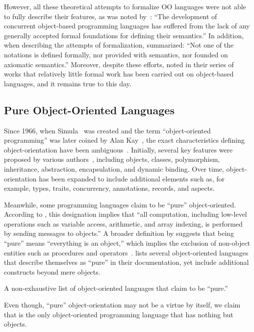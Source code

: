 However, all these theoretical attempts to formalize OO languages were not able to fully describe their features, as was noted by~\citet{nierstrasz1991towards}: ``The development of concurrent object-based programming languages has suffered from the lack of any generally accepted formal foundations for defining their semantics.''
In addition, when describing the attempts of formalization, \citet{eden2002visual} summarized: ``Not one of the notations is defined formally, nor provided with  semantics, nor founded on axiomatic semantics.''
Moreover, despite these efforts, \citet{ciaffaglione2003reasoning,ciaffaglione2003typetheories,ciaffaglione2007theory_of_contexts} noted in their series of works that relatively little formal work has been carried out on object-based languages, and it remains true to this day.

\subsection{Pure Object-Oriented Languages}

Since 1966, when Simula~\citep{dahl1966simula} was created and the term ``object-oriented programming'' was later coined by
Alan Kay~\citep{kay97keynote}, the exact characteristics defining object-orientation have been ambiguous~\citep{stefik1985object,madsen1988object,armstrong2006quarks}.
Initially, several key features were proposed by various authors~\citep{nygaard1986basic,stroustrup1987object,meyer1988object,korson1990understanding,wirfs1990designing,coad1991object,booch1994object}, including objects, classes, polymorphism, inheritance, abstraction, encapsulation, and dynamic binding.
Over time, object-orientation has been expanded to include additional elements such as, for example, types, traits, concurrency, annotations, records, and aspects.

Meanwhile, some programming languages claim to be ``pure'' object-oriented.
According to \citet{chambers1991making}, this designation implies that ``all computation, including low-level operations such as variable access, arithmetic, and array indexing, is performed by sending messages to objects.''
A broader definition by \citet{west2004object} suggests that being ``pure'' means ``everything is an object,'' which implies the exclusion of non-object entities such as procedures and operators~\citep{joque2016invention}.
 lists several object-oriented languages that describe themselves as ``pure'' in their documentation, yet include additional constructs beyond mere objects.

\begin{table}
\caption{A non-exhaustive list of object-oriented languages that claim to be ``pure.''}
\label{tab:languages}

\end{table}

Even though, ``pure'' object-orientation may not be a virtue by itself, we claim that \eolang{} is the only object-oriented programming language that has nothing but objects.

